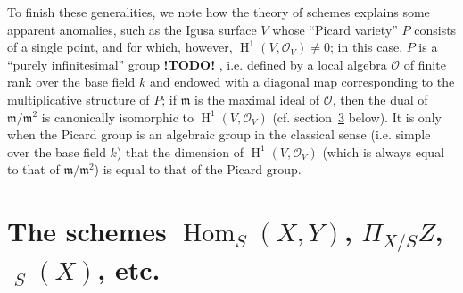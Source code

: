 \documentclass{article}
\theoremstyle{plain}
\theoremstyle{definition}
\newcommand{\sh}[1]{{\mathscr{#1}}}
\newcommand{\fk}[1]{{\mathfrak{#1}}}
\DeclareMathOperator{\Hom}{Hom}
\DeclareMathOperator{\Aut}{Aut}
\DeclareMathOperator{\shAut}{\underline{\Aut}}
\DeclareMathOperator{\HH}{H}
\newcommand{\todo}{\textbf{ !TODO! }}
\begin{document}
To finish these generalities, we note how the theory of schemes explains some apparent anomalies, such as the Igusa surface $V$ whose ``Picard variety'' $P$ consists of a single point, and for which, however, $\HH^1(V,\sh{O}_V)\neq0$;
in this case, $P$ is a ``purely infinitesimal'' group \todo, i.e. defined by a local algebra $\sh{O}$ of finite rank over the base field $k$ and endowed with a diagonal map corresponding to the multiplicative structure of $P$;
if $\fk{m}$ is the maximal ideal of $\sh{O}$, then the dual of $\fk{m}/\fk{m}^2$ is canonically isomorphic to $\HH^1(V,\sh{O}_V)$ (cf. section~\hyperref[C.3]{3} below).
It is only when the Picard group is an algebraic group in the classical sense (i.e. simple over the base field $k$) that the dimension of $\HH^1(V,\sh{O}_V)$ (which is always equal to that of $\fk{m}/\fk{m}^2$) is equal to that of the Picard group.


\section{The schemes $\Hom_S(X,Y)$, $\Pi_{X/S}Z$, $\shAut_S(X)$, etc.}
\label{C.2}
\end{document}
